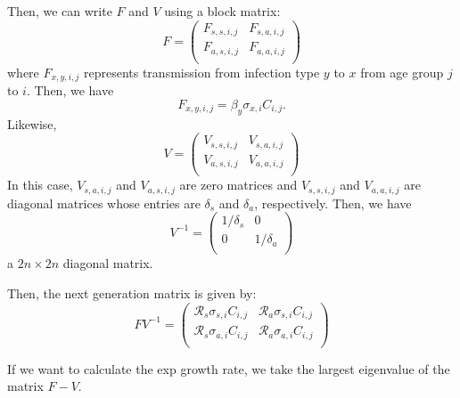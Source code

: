 \documentclass[12pt]{article}
\begin{document}
Then, we can write $F$ and $V$ using a block matrix:
\begin{equation}
F = \begin{pmatrix}
F_{s,s,i,j} & F_{s,a,i,j}\\
F_{a,s,i,j} & F_{a,a,i,j}\\
\end{pmatrix}
\end{equation}
where $F_{x,y,i,j}$ represents transmission from infection type $y$ to $x$ from age group $j$ to $i$.
Then, we have
\begin{equation}
F_{x,y,i,j} = \beta_y \sigma_{x,i} C_{i,j}.
\end{equation}
Likewise,
\begin{equation}
V = \begin{pmatrix}
V_{s,s,i,j} & V_{s,a,i,j}\\
V_{a,s,i,j} & V_{a,a,i,j}\\
\end{pmatrix}
\end{equation}
In this case, $V_{s,a,i,j}$ and $V_{a,s,i,j}$ are zero matrices and $V_{s,s,i,j}$ and $V_{a,a,i,j}$ are diagonal matrices whose entries are $\delta_s$ and $\delta_a$, respectively.
Then, we have 
\begin{equation}
V^{-1} = \begin{pmatrix}
1/\delta_s & 0\\
0 & 1/\delta_a\\
\end{pmatrix}
\end{equation}
a $2n \times 2n$ diagonal matrix.

Then, the next generation matrix is given by:
\begin{equation}
FV^{-1} = \begin{pmatrix}
\mathcal R_s \sigma_{s,i} C_{i,j} & \mathcal R_a \sigma_{s,i} C_{i,j}\\
\mathcal R_s \sigma_{a,i} C_{i,j} & \mathcal R_a \sigma_{a,i} C_{i,j}\\
\end{pmatrix}
\end{equation}

If we want to calculate the exp growth rate, we take the largest eigenvalue of the matrix $F-V$. %
\end{document}
